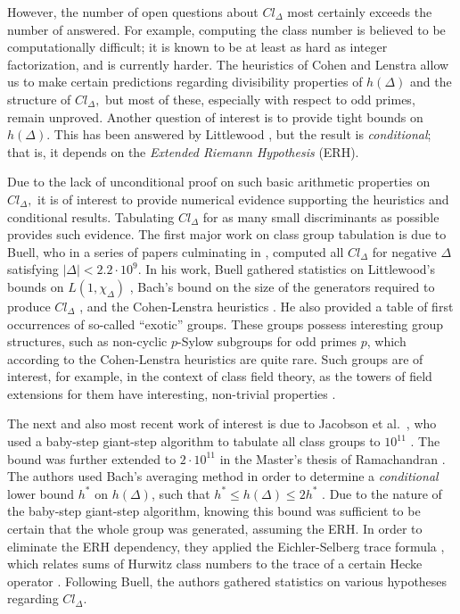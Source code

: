 \documentclass{mcom-l}
\theoremstyle{definition}
\begin{document}
However, the number of open questions about $Cl_\Delta$ most certainly
exceeds the number of answered. For example, computing the class
number is believed to be computationally difficult; it is known to be at
least as hard as integer factorization, and is currently harder.  The
heuristics of Cohen and Lenstra \cite{cohen2} allow us to make certain
predictions regarding divisibility properties of $h(\Delta)$ and the
structure of $Cl_\Delta,$ but most of these, especially with respect
to odd primes, remain unproved.  Another question of interest is to
provide tight bounds on $h(\Delta)$.  This has been answered by
Littlewood \cite{littlewood}, but the result is \emph{conditional};
that is, it depends on the \emph{Extended Riemann Hypothesis} (ERH).

Due to the lack of unconditional proof on such basic arithmetic
properties on $Cl_\Delta,$ it is of interest to provide numerical
evidence supporting the heuristics and conditional results.
Tabulating $Cl_\Delta$ for as many small discriminants as possible
provides such evidence.  The first major work on class group
tabulation is due to Buell, who in a series of papers culminating in
\cite{buell}, computed all $Cl_\Delta$ for negative $\Delta$
satisfying $|\Delta| < 2.2\cdot 10^9$. In his work, Buell gathered
statistics on Littlewood's bounds on $L(1, \chi_\Delta)$
\cite{littlewood}, Bach's bound on the size of the generators required
to produce $Cl_\Delta$ \cite{bach1}, and the Cohen-Lenstra heuristics
\cite{cohen2}. He also provided a table of first occurrences of
so-called ``exotic'' groups. These groups possess interesting group
structures, such as non-cyclic $p$-Sylow subgroups for odd primes $p$,
which according to the Cohen-Lenstra heuristics are quite rare.
Such groups are of interest, for example, in the context of class field
theory, as the towers of field extensions for them have interesting,
non-trivial properties \cite{meyer}.

The next and also most recent work of interest is due to Jacobson et
al.\ \cite{jacobson}, who used a baby-step giant-step algorithm to
tabulate all class groups to $10^{11}$
\cite[Algorithm~4.1]{buchmann}. The bound was further extended to
$2\cdot 10^{11}$ in the Master's thesis of Ramachandran
\cite{ramachandran}. The authors used Bach's averaging method in order
to determine a \emph{conditional} lower bound $h^*$ on $h(\Delta)$,
such that \mbox{$h^* \leq h(\Delta) \leq 2h^*$} \cite{bach2}. Due to the
nature of the baby-step giant-step algorithm, knowing this bound was
sufficient to be certain that the whole group was generated, assuming
the ERH. In order to eliminate the ERH dependency, they applied the
Eichler-Selberg trace formula \cite{schoof}, which relates sums of
Hurwitz class numbers to the trace of a certain Hecke operator
\cite[Formula~2.2]{jacobson}. Following Buell, the authors gathered
statistics on various hypotheses regarding $Cl_\Delta$.
\end{document}
